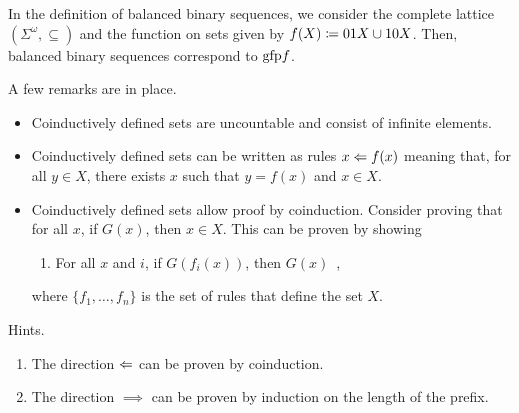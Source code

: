 {{

In the definition of balanced binary sequences, we consider the complete lattice $(\Sigma^\omega, \subseteq)$ and the function on sets given by $f(X) \coloneqq 01X \cup 10X$. 
Then, balanced binary sequences correspond to $\mathrm{gfp} f$.	


A few remarks are in place.
\begin{itemize}
	\item 
		Coinductively defined sets are uncountable and consist of infinite elements.
	\item 
		Coinductively defined sets can be written as rules $x \Leftarrow f(x)$ meaning that, for all $y \in X$, there exists $x$ such that $y = f(x)$ and $x \in X$.
	\item 
		Coinductively defined sets allow proof by coinduction.
		Consider proving that for all $x$, if $G(x)$, then $x \in X$.
		This can be proven by showing
		\begin{enumerate}
			\item For all $x$ and $i$, if $G(f_i(x))$, then $G(x)$ \,,
		\end{enumerate}
		where $\{f_1, \ldots, f_n\}$ is the set of rules that define the set $X$.
\end{itemize}



Hints.
\begin{enumerate}
	\item The direction $\Leftarrow$ can be proven by coinduction.
	\item The direction $\implies$ can be proven by induction on the length of the prefix.
\end{enumerate}

}} %
